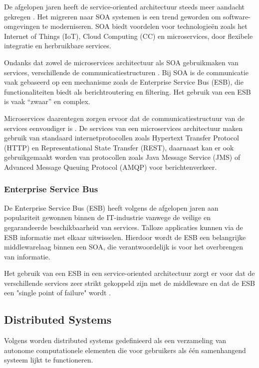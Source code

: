 De afgelopen jaren heeft de service-oriented architectuur steeds meer aandacht gekregen \autocite{Niknejad2020}. Het migreren naar SOA systemen is een trend geworden om software-omgevingen te moderniseren. SOA biedt voordelen voor technologieën zoals het Internet of Things (IoT), Cloud Computing (CC) en microservices, door flexibele integratie en herbruikbare services.

Ondanks dat zowel de microservices architectuur als SOA gebruikmaken van services, verschillende de communicatiestructuren \autocite{Blinowski2022}. Bij SOA is de communicatie vaak gebaseerd op een mechanisme zoals de Enterprise Service Bus (ESB), die functionaliteiten biedt als berichtroutering en filtering. Het gebruik van een ESB is vaak ``zwaar'' en complex. 

Microservices daarentegen zorgen ervoor dat de communicatiestructuur van de services eenvoudiger is \autocite{Blinowski2022}. De services van een microservices architectuur maken gebruik van standaard internetprotocollen zoals Hypertext Transfer Protocol (HTTP) en Representational State Transfer (REST), daarnaast kan er ook gebruikgemaakt worden van protocollen zoals Java Message Service (JMS) of Advanced Message Queuing Protocol (AMQP) voor berichtenverkeer.

\subsubsection{Enterprise Service Bus}

De Enterprise Service Bus (ESB) heeft volgens \textcite{Aziz2020} de afgelopen jaren aan populariteit gewonnen binnen de IT-industrie vanwege de veilige en gegarandeerde beschikbaarheid van services. Talloze applicaties kunnen via de ESB informatie met elkaar uitwisselen. Hierdoor wordt de ESB een belangrijke middlewarelaag binnen een SOA, die verantwoordelijk is voor het overbrengen van informatie. 

Het gebruik van een ESB in een service-oriented architectuur zorgt er voor dat de verschillende services zeer strikt gekoppeld zijn met de middleware en dat de ESB een "single point of failure" wordt \autocite{Raj2021}.

\subsection{Distributed Systems}
\label{sec:dissys}

Volgens \textcite{Steen2018} worden distributed systems gedefinieerd als een verzameling van autonome computationele elementen die voor gebruikers als één samenhangend systeem lijkt te functioneren.

